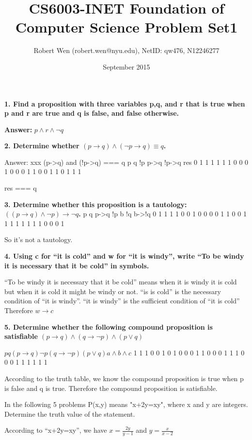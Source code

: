 \documentclass{article}
\title{CS6003-INET Foundation of Computer Science Problem Set1}
\author{Robert Wen (robert.wen@nyu.edu), NetID: qw476, N12246277}
\date{September 2015}
\begin{document}
\maketitle
\setlength{\parindent}{2ex}
\textbf{1. Find a proposition with three variables p,q, and r that is true when p and r are true and q is false, and false otherwise.}

\textbf{Answer:} $p \land r \land \lnot q$
\newline

\textbf{2. Determine whether $(p \to q) \land (\lnot p \to q) \equiv q$.}

Answer: xxx
(p->q) and (!p->q) === q
p  q  !p  p->q  !p->q   res
0  1  1   1     1       1
1  0  0   0     1       0
0  0  1   1     0       0
1  1  0   1     1       1

res === q

\textbf{3. Determine whether this proposition is a tautology: $((p \to q) \land \lnot p) \to \lnot q$.}
p  q  p->q  !p   b   !q   b->!q
0  1  1     1    1   0    0
1  0  0     0    0   1    1
0  0  1     1    1   1    1
1  1  1     0    0   0    1

So it's not a tautology.

\textbf{4. Using c for ``it is cold'' and w for ``it is windy'', write ``To be windy it is necessary that it be cold'' in symbols.}

``To be windy it is necessary that it be cold'' means when it is windy it is cold but when it is cold it might be windy or not. ``is is cold'' is the necessary condition of ``it is windy''. ``it is windy'' is the sufficient condition of ``it is cold''
Therefore $w \to c$

\textbf{5. Determine whether the following compound proposition is satisfiable $(p \to q) \land (q \to \lnot p)\land (p \lor q)$}

$p  q  (p \to q)  \lnot p  (q \to \lnot p)  (p \lor q)  a \land b \land c$
1  1  1          0         0                1          0
1  0  0          0         1                1          0
0  0  1          1         1                0          0
0  1  1          1         1                1          1

According to the truth table, we know the compound proposition is true when p is false and q is true.
Therefore the compound proposition is satisfiable.

In the following 5 problems P(x,y) means "x+2y=xy", where x and y are integers. Determine the truth value of the statement.

According to ``x+2y=xy'', we have $x = \frac{2y}{y-1}$ and $y = \frac{x}{x-2}$
\end{document}
